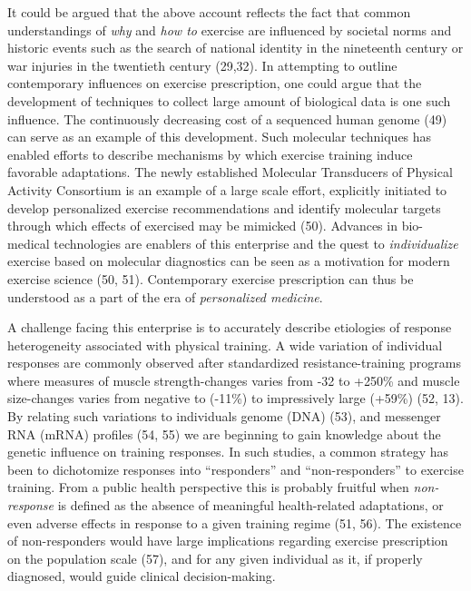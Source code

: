 \documentclass[twoside,10pt]{gihclass} %
\begin{document}
It could be argued that the above account reflects the fact that common understandings of \emph{why} and \emph{how to} exercise are influenced by societal norms and historic events such as the search of national identity in the nineteenth century or war injuries in the twentieth century
(29,32).
In attempting to outline contemporary influences on exercise prescription, one could argue that the development of techniques to collect large amount of biological data is one such influence. The continuously decreasing cost of a sequenced human genome
(49) can serve as an example of this development.
Such molecular techniques has enabled efforts to describe mechanisms by which exercise training induce favorable adaptations. The newly established Molecular Transducers of Physical Activity Consortium is an example of a large scale effort, explicitly initiated to develop personalized exercise recommendations and identify molecular targets through which effects of exercised may be mimicked (50).
Advances in bio-medical technologies are enablers of this enterprise and the quest to \emph{individualize} exercise based on molecular diagnostics can be seen as a motivation for modern exercise science
(50, 51).
Contemporary exercise prescription can thus be understood as a part of the era of \emph{personalized medicine}.

A challenge facing this enterprise is to accurately describe etiologies of response heterogeneity associated with physical training. A wide variation of individual responses are commonly observed after standardized resistance-training programs where measures of muscle strength-changes varies from -32 to +250\% and muscle size-changes varies from negative to (-11\%) to impressively large (+59\%)
(52, 13).
By relating such variations to individuals genome (DNA)
(53),
and messenger RNA (mRNA) profiles
(54, 55)
we are beginning to gain knowledge about the genetic influence on training responses.
In such studies, a common strategy has been to dichotomize responses into ``responders'' and ``non-responders'' to exercise training. From a public health perspective this is probably fruitful when \emph{non-response} is defined as the absence of meaningful health-related adaptations, or even adverse effects in response to a given training regime
(51, 56).
The existence of non-responders would have large implications regarding exercise prescription on the population scale
(57),
and for any given individual as it, if properly diagnosed, would guide clinical decision-making.
\end{document}
